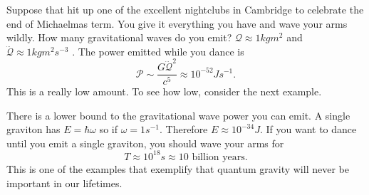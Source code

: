 \begin{example}[]
  Suppose that hit up one of the excellent nightclubs in Cambridge to celebrate the end of Michaelmas term.
  You give it everything you have and wave your arms wildly. How many gravitational waves do you emit?
  $\mathcal{Q} \approx 1 kg m^2$  and $\dddot{\mathcal{Q}} \approx 1 kg m^2 s^{-3}$ . The power emitted while you dance is
  \begin{equation}
    \mathcal{P} \sim \frac{G \dddot{\mathcal{Q}}^2}{c^5} \approx 10^{-52} J s^{-1}.
  \end{equation}
  This is a really low amount. To see how low, consider the next example.
\end{example}

\begin{example}[]
  There is a lower bound to the gravitational wave power you can emit. A single graviton has $E = \hbar \omega$ so if $\omega = 1 s^{-1}$.
  Therefore $E \approx 10^{-34} J$. If you want to dance until you emit a single graviton, you should wave your arms for
  \begin{equation}
    T \approx 10^{18}s \approx 10 \text{ billion years}.
  \end{equation}
  This is one of the examples that exemplify that quantum gravity will never be important in our lifetimes.
\end{example}
